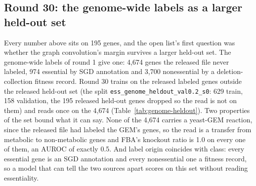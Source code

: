 


\subsection{Round 30: the genome-wide labels as a larger held-out set}
\label{sec:round30}

Every number above sits on 195 genes, and the open list's first question was whether
the graph convolution's margin survives a larger held-out set. The genome-wide labels
of round 1 give one: 4,674 genes the released file never labeled, 974 essential by SGD
annotation and 3,700 nonessential by a deletion-collection fitness record. Round 30
trains on the released labeled genes outside the released held-out set (the split
\texttt{ess\_genome\_heldout\_val0.2\_s0}: 629 train, 158 validation, the 195 released
held-out genes dropped so the read is not on them) and reads once on the 4,674
(Table~\ref{tab:genome-heldout}). Two properties of the set bound what it can say.
None of the 4,674 carries a yeast-GEM reaction, since the released file had labeled the
GEM's genes, so the read is a transfer from metabolic to non-metabolic genes and FBA's
knockout ratio is 1.0 on every one of them, an AUROC of exactly 0.5. And label origin
coincides with class: every essential gene is an SGD annotation and every nonessential
one a fitness record, so a model that can tell the two sources apart scores on this set
without reading essentiality.






